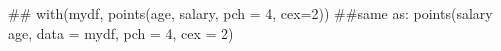 \begin{Schunk}
\begin{Sinput}
 ## with(mydf, points(age, salary, pch = 4, cex=2)) ##same as:
 points(salary ~ age, data = mydf, pch = 4, cex = 2)
\end{Sinput}
\end{Schunk}
